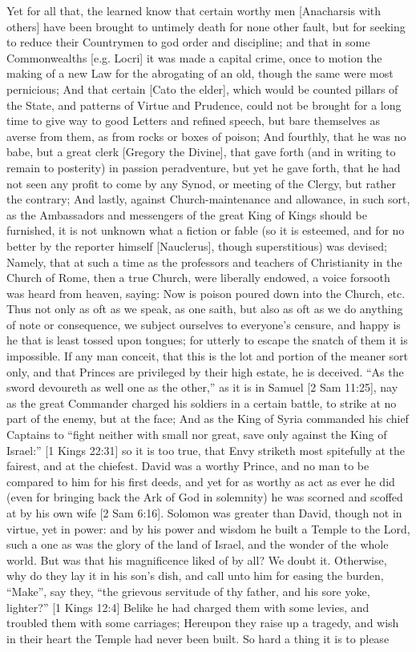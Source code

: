 {\par }{\IP Yet for all that, the learned know that certain worthy men [Anacharsis with others] have been brought to untimely death for none other fault, but for seeking to reduce their Countrymen to god order and discipline; and that in some Commonwealths [e.g. Locri] it was made a capital crime, once to motion the making of a new Law for the abrogating of an old, though the same were most pernicious; And that certain [Cato the elder], which would be counted pillars of the State, and patterns of Virtue and Prudence, could not be brought for a long time to give way to good Letters and refined speech, but bare themselves as averse from them, as from rocks or boxes of poison; And fourthly, that he was no babe, but a great clerk [Gregory the Divine], that gave forth (and in writing to remain to posterity) in passion peradventure, but yet he gave forth, that he had not seen any profit to come by any Synod, or meeting of the Clergy, but rather the contrary; And lastly, against Church-maintenance and allowance, in such sort, as the Ambassadors and messengers of the great King of Kings should be furnished, it is not unknown what a fiction or fable (so it is esteemed, and for no better by the reporter himself [Nauclerus], though superstitious) was devised; Namely, that at such a time as the professors and teachers of Christianity in the Church of Rome, then a true Church, were liberally endowed, a voice forsooth was heard from heaven, saying: Now is poison poured down into the Church, etc. Thus not only as oft as we speak, as one saith, but also as oft as we do anything of note or consequence, we subject ourselves to everyone’s censure, and happy is he that is least tossed upon tongues; for utterly to escape the snatch of them it is impossible. If any man conceit, that this is the lot and portion of the meaner sort only, and that Princes are privileged by their high estate, he is deceived. “As the sword devoureth as well one as the other,” as it is in Samuel [2 Sam 11:25], nay as the great Commander charged his soldiers in a certain battle, to strike at no part of the enemy, but at the face; And as the King of Syria commanded his chief Captains to “fight neither with small nor great, save only against the King of Israel:” [1 Kings 22:31] so it is too true, that Envy striketh most spitefully at the fairest, and at the chiefest. David was a worthy Prince, and no man to be compared to him for his first deeds, and yet for as worthy as act as ever he did (even for bringing back the Ark of God in solemnity) he was scorned and scoffed at by his own wife [2 Sam 6:16]. Solomon was greater than David, though not in virtue, yet in power: and by his power and wisdom he built a Temple to the Lord, such a one as was the glory of the land of Israel, and the wonder of the whole world. But was that his magnificence liked of by all? We doubt it. Otherwise, why do they lay it in his son’s dish, and call unto him for easing the burden, “Make”, say they, “the grievous servitude of thy father, and his sore yoke, lighter?” [1 Kings 12:4] Belike he had charged them with some levies, and troubled them with some carriages; Hereupon they raise up a tragedy, and wish in their heart the Temple had never been built. So hard a thing it is to please }
